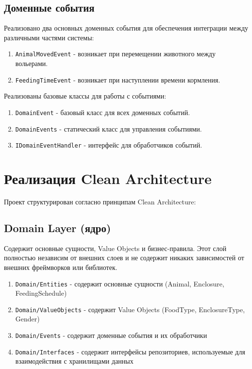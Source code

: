 \documentclass[a4paper,12pt]{article}
\begin{document}
\subsection{Доменные события}

Реализовано два основных доменных события для обеспечения интеграции между различными частями системы:

\begin{enumerate}
    \item \texttt{AnimalMovedEvent} - возникает при перемещении животного между вольерами.
    \item \texttt{FeedingTimeEvent} - возникает при наступлении времени кормления.
\end{enumerate}

Реализованы базовые классы для работы с событиями:

\begin{enumerate}
    \item \texttt{DomainEvent} - базовый класс для всех доменных событий.
    \item \texttt{DomainEvents} - статический класс для управления событиями.
    \item \texttt{IDomainEventHandler} - интерфейс для обработчиков событий.
\end{enumerate}

\section{Реализация Clean Architecture}

Проект структурирован согласно принципам Clean Architecture:

\subsection{Domain Layer (ядро)}

Содержит основные сущности, Value Objects и бизнес-правила. Этот слой полностью независим от внешних слоев и не содержит никаких зависимостей от внешних фреймворков или библиотек.

\begin{enumerate}
    \item \texttt{Domain/Entities} - содержит основные сущности (Animal, Enclosure, FeedingSchedule)
    \item \texttt{Domain/ValueObjects} - содержит Value Objects (FoodType, EnclosureType, Gender)
    \item \texttt{Domain/Events} - содержит доменные события и их обработчики
    \item \texttt{Domain/Interfaces} - содержит интерфейсы репозиториев, используемые для взаимодействия с хранилищами данных
\end{enumerate}
\end{document}
